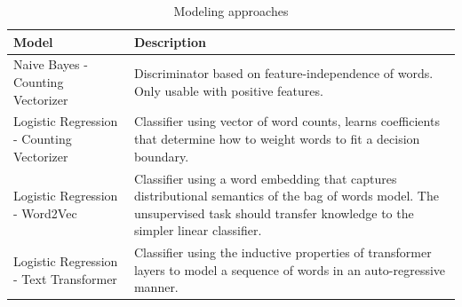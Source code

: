 \documentclass[]{style/ceurart}
\begin{document}
\begin{table}
\centering
\caption{Modeling approaches}
\renewcommand{\arraystretch}{1.2}
\begin{tabular}{p{3in}p{3in}}
\toprule
\textbf{Model} & \textbf{Description} \\ \midrule
Naive Bayes - Counting Vectorizer & Discriminator based on feature-independence of words. Only usable with positive features. \\ \midrule
Logistic Regression - Counting Vectorizer & Classifier using vector of word counts, learns coefficients that determine how to weight words to fit a decision boundary. \\ \midrule
Logistic Regression - Word2Vec  & Classifier using a word embedding that captures distributional semantics of the bag of words model. The unsupervised task should transfer knowledge to the simpler linear classifier. \\ \midrule
Logistic Regression - Text Transformer & Classifier using the inductive properties of transformer layers to model a sequence of words in an auto-regressive manner. \\ \bottomrule
\end{tabular}
\end{table}



\end{document}

